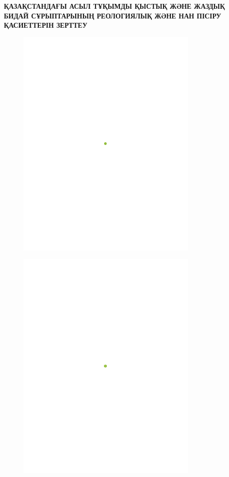 
{\bfseries ҚАЗАҚСТАНДАҒЫ АСЫЛ ТҰҚЫМДЫ ҚЫСТЫҚ ЖӘНЕ ЖАЗДЫҚ БИДАЙ СҰРЫПТАРЫНЫҢ
РЕОЛОГИЯЛЫҚ ЖӘНЕ НАН ПІСІРУ ҚАСИЕТТЕРІН ЗЕРТТЕУ}

\begin{figure}[H]
	\centering
	\includegraphics[width=0.8\textwidth]{media/pish2/image14}
	\caption*{}
\end{figure}

\begin{figure}[H]
	\centering
	\includegraphics[width=0.8\textwidth]{media/pish2/image15}
	\caption*{}
\end{figure}

